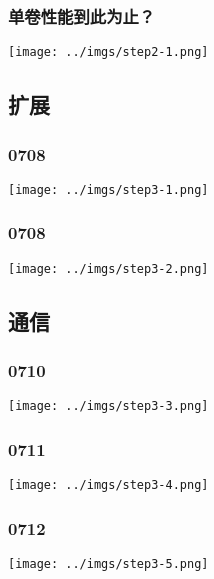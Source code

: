 \documentclass[UTF8,8pt,xcolor=dvipsnames]{beamer}
\begin{document}
\begin{frame}[fragile]
    \frametitle{单卷性能到此为止？}
    \begin{center}
        \texttt{[image: ../imgs/step2-1.png]}
    \end{center}
\end{frame}

\subsection{扩展}

\begin{frame}[fragile]
    \frametitle{0708}
    \begin{center}
        \texttt{[image: ../imgs/step3-1.png]}
    \end{center}
\end{frame}

\begin{frame}[fragile]
    \frametitle{0708}
    \begin{center}
        \texttt{[image: ../imgs/step3-2.png]}
    \end{center}
\end{frame}

\subsection{通信}

\begin{frame}[fragile]
    \frametitle{0710}
    \begin{center}
        \texttt{[image: ../imgs/step3-3.png]}
    \end{center}
\end{frame}

\begin{frame}[fragile]
    \frametitle{0711}
    \begin{center}
        \texttt{[image: ../imgs/step3-4.png]}
    \end{center}
\end{frame}

\begin{frame}[fragile]
    \frametitle{0712}
    \begin{center}
        \texttt{[image: ../imgs/step3-5.png]}
    \end{center}
\end{frame}
\end{document}
